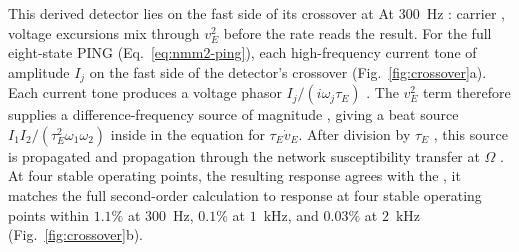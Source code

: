 \documentclass[11pt,a4paper]{article}
\providecommand{\DIFaddtex}[1]{{\protect\color{blue} \sf #1}} %
\providecommand{\DIFdeltex}[1]{{\protect\color{red} \scriptsize #1}} %
\providecommand{\DIFaddbegin}{} %
\providecommand{\DIFaddend}{} %
\providecommand{\DIFdelbegin}{} %
\providecommand{\DIFdelend}{} %
\providecommand{\DIFadd}[1]{\texorpdfstring{\DIFaddtex{#1}}{#1}} %
\providecommand{\DIFdel}[1]{\texorpdfstring{\DIFdeltex{#1}}{}} %
\begin{document}
\DIFdelbegin \DIFdel{This derived detector lies on the fast side of its crossover at }\DIFdelend \DIFaddbegin \DIFadd{At }\DIFaddend $300$~Hz\DIFdelbegin \DIFdel{:
carrier }\DIFdelend \DIFaddbegin \DIFadd{, }\DIFaddend voltage excursions mix through $v_E^2$ \DIFdelbegin \DIFdel{before the rate reads the result.
For the full eight-state PING (Eq.~\eqref{eq:nmm2-ping}), each high-frequency current tone
of amplitude $I_j$ }\DIFdelend \DIFaddbegin \DIFadd{on the fast side of
the detector's crossover (Fig.~\ref{fig:crossover}a). Each current tone
}\DIFaddend produces a voltage phasor $I_j/(i\omega_j\tau_E)$\DIFdelbegin \DIFdel{.
The $v_E^2$ term therefore supplies a difference-frequency source
of magnitude
}\DIFdelend \DIFaddbegin \DIFadd{, giving a beat source
}\DIFaddend $I_1I_2/(\tau_E^2\omega_1\omega_2)$ \DIFdelbegin \DIFdel{inside }\DIFdelend \DIFaddbegin \DIFadd{in }\DIFaddend the equation for $\tau_E\dot v_E$.
After division by $\tau_E$ \DIFdelbegin \DIFdel{, this source is propagated }\DIFdelend \DIFaddbegin \DIFadd{and propagation }\DIFaddend through the network \DIFdelbegin \DIFdel{susceptibility }\DIFdelend \DIFaddbegin \DIFadd{transfer }\DIFaddend at
$\Omega$\DIFdelbegin \DIFdel{. At four stable operating points, the resulting
response agrees with the }\DIFdelend \DIFaddbegin \DIFadd{, it matches the }\DIFaddend full second-order \DIFdelbegin \DIFdel{calculation to }\DIFdelend \DIFaddbegin \DIFadd{response at four stable operating
points }\DIFaddend within $1.1\%$ at $300$~Hz, $0.1\%$ at $1$~kHz, and $0.03\%$
at $2$~kHz (Fig.~\ref{fig:crossover}b).
\end{document}
